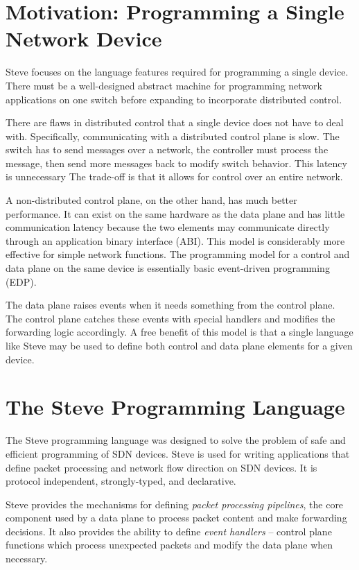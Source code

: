 \section{Motivation: Programming a Single Network Device}

Steve focuses on the language features required for programming a single device. There must be a well-designed abstract machine for programming network applications on one switch before expanding to incorporate distributed control.

There are flaws in distributed control that a single device does not have to deal with.
Specifically, communicating with a distributed control plane is slow.
The switch has to send messages over a network, the controller must process the message, then send more messages back to modify switch behavior. This latency is unnecessary
The trade-off is that it allows for control over an
entire network.

A non-distributed control plane, on the other hand, has much
better performance.
It can exist on the
same hardware as the data plane and has little communication latency
because the two elements may communicate directly through an application
binary interface (ABI).
This model is considerably more effective for simple network functions.
The programming model for a control and data plane on the same device
is essentially basic event-driven programming (EDP).

The data plane raises events when it needs something from the control plane.
The control plane catches these events with special handlers and modifies the
forwarding logic accordingly.
A free benefit of this model is that a single language like Steve may
be used to define both control and data plane elements for a given 
device. 
 
\section{The Steve Programming Language}

The Steve programming language was designed to solve the problem of safe and efficient programming of SDN devices.
Steve is used for writing applications that define packet processing and network flow direction on SDN devices.
It is protocol independent, strongly-typed,
and declarative.

Steve provides the mechanisms for defining \emph{packet
processing pipelines}, the core component used by a data plane
to process packet content and make forwarding decisions.
It also provides the ability to define \emph{event handlers} --
control plane functions which process unexpected packets and
modify the data plane when necessary.

